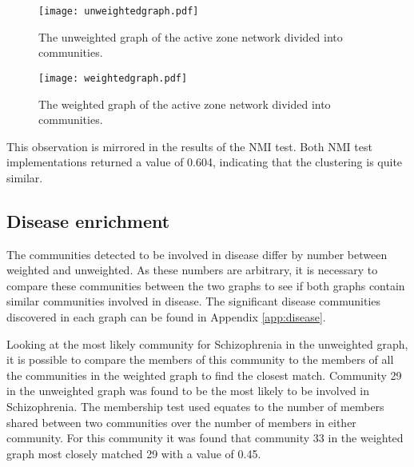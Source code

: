 \begin{figure}
    \centering
    \texttt{[image: unweightedgraph.pdf]}
    \caption{The unweighted graph of the active zone network divided into communities.}
    \label{fig:uwgraph}
\end{figure}

\begin{figure}
    \centering
    \texttt{[image: weightedgraph.pdf]}
    \caption{The weighted graph of the active zone network divided into communities.}
    \label{fig:wgraph}
\end{figure}


This observation is mirrored in the results of the NMI test.
Both NMI test implementations returned a value of 0.604, indicating that the clustering is quite similar.


\subsection{Disease enrichment}
The communities detected to be involved in disease differ by number between weighted and unweighted.
As these numbers are arbitrary, it is necessary to compare these communities between the two graphs to see if both graphs contain similar communities involved in disease.
The significant disease communities discovered in each graph can be found in Appendix \ref{app:disease}.

Looking at the most likely community for Schizophrenia in the unweighted graph, it is possible to compare the members of this community to the members of all the communities in the weighted graph to find the closest match.
Community 29 in the unweighted graph was found to be the most likely to be involved in Schizophrenia.
The membership test used equates to the number of members shared between two communities over the number of members in either community.
For this community it was found that community 33 in the weighted graph most closely matched 29 with a value of 0.45.

